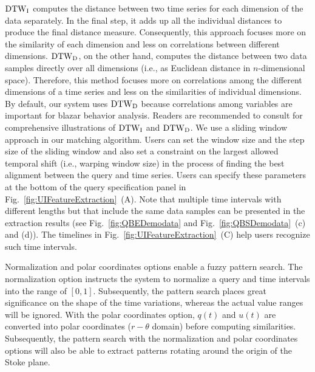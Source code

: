 ${\rm DTW}_{\rm I}$ computes the distance between two time series for each dimension of the data separately. 
In the final step, it adds up all the individual distances to produce the final distance measure.
Consequently, this approach focuses more on the similarity of each dimension and less on correlations between different dimensions.
${\rm DTW}_{\rm D}$, on the other hand, computes the distance between two data samples directly over all dimensions (i.e., as Euclidean distance in $n$-dimensional space).
Therefore, this method focuses more on correlations among the different dimensions of a time series and less on the similarities of individual dimensions. 
By default, our system uses ${\rm DTW}_{\rm D}$ because correlations among variables are important for blazar behavior analysis.
Readers are recommended to consult \cite[Fig. 1]{Shokoohi-Yekta2015} for comprehensive illustrations of ${\rm DTW}_{\rm I}$ and ${\rm DTW}_{\rm D}$.
We use a sliding window approach in our matching algorithm.
Users can set the window size and the step size of the sliding window and also set a constraint on the largest allowed temporal shift (i.e., warping window size)
in the process of finding the best alignment between the query and time series.
Users can specify these parameters at the bottom of the query specification panel in Fig.~\ref{fig:UIFeatureExtraction}~(A).
Note that multiple time intervals with different lengths but that include the same data samples can be presented in the extraction results (see Fig.~\ref{fig:QBEDemodata} and Fig.~\ref{fig:QBSDemodata}~(c) and (d)).
The timelines in Fig.~\ref{fig:UIFeatureExtraction}~(C) help users recognize such time intervals. 

Normalization and polar coordinates options enable a fuzzy pattern search.
The normalization option instructs the system to normalize a query and time intervals into the range of $[0, 1]$.
Subsequently, the pattern search places great significance on the shape of the time variations, whereas the actual value ranges will be ignored.
With the polar coordinates option, 
$q(t)$ and $u(t)$ are converted into polar coordinates ($r-\theta$ domain) before computing similarities.
Subsequently, the pattern search with the normalization and polar coordinates options will also be able to extract patterns rotating around the origin of the Stoke plane.

